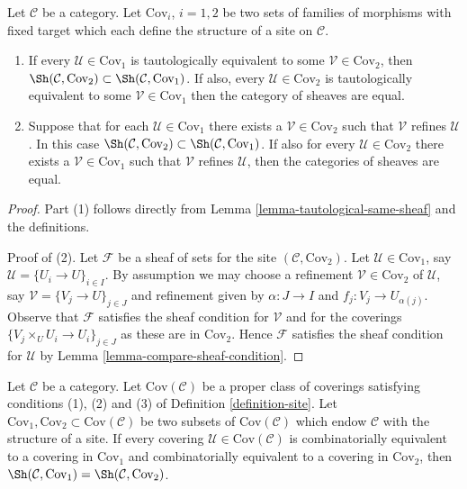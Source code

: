 \begin{lemma}
\label{lemma-refine-same-topology}
Let $\mathcal{C}$ be a category. Let $\text{Cov}_i$, $i = 1, 2$
be two sets of families of morphisms with fixed target which
each define the structure of a site on $\mathcal{C}$.
\begin{enumerate}
\item If every $\mathcal{U} \in \text{Cov}_1$ is tautologically
equivalent to some $\mathcal{V} \in \text{Cov}_2$, then
$\Sh(\mathcal{C}, \text{Cov}_2) \subset
\Sh(\mathcal{C}, \text{Cov}_1)$.
If also, every $\mathcal{U} \in \text{Cov}_2$ is tautologically
equivalent to some $\mathcal{V} \in \text{Cov}_1$ then
the category of sheaves are equal.
\item Suppose
that for each $\mathcal{U} \in \text{Cov}_1$ there exists a
$\mathcal{V} \in \text{Cov}_2$ such that $\mathcal{V}$ refines
$\mathcal{U}$. In this case
$\Sh(\mathcal{C}, \text{Cov}_2) \subset
\Sh(\mathcal{C}, \text{Cov}_1)$.
If also for every $\mathcal{U} \in \text{Cov}_2$
there exists a $\mathcal{V} \in \text{Cov}_1$ such that $\mathcal{V}$
refines $\mathcal{U}$, then the categories of sheaves
are equal.
\end{enumerate}
\end{lemma}

\begin{proof}
Part (1) follows directly from Lemma \ref{lemma-tautological-same-sheaf}
and the definitions.

\medskip\noindent
Proof of (2). Let $\mathcal{F}$ be a sheaf of sets for the site
$(\mathcal{C}, \text{Cov}_2)$. Let $\mathcal{U} \in \text{Cov}_1$,
say $\mathcal{U} = \{U_i \to U\}_{i \in I}$. By assumption we may choose a
refinement $\mathcal{V} \in \text{Cov}_2$ of $\mathcal{U}$, say
$\mathcal{V} = \{V_j \to U\}_{j \in J}$ and refinement given
by $\alpha : J \to I$ and $f_j : V_j \to U_{\alpha(j)}$.
Observe that $\mathcal{F}$ satisfies the sheaf condition for
$\mathcal{V}$ and for the coverings $\{V_j \times_U U_i \to U_i\}_{j \in J}$
as these are in $\text{Cov}_2$. Hence $\mathcal{F}$ satisfies
the sheaf condition for $\mathcal{U}$ by
Lemma \ref{lemma-compare-sheaf-condition}.
\end{proof}

\begin{lemma}
\label{lemma-choice-set-coverings-immaterial}
Let $\mathcal{C}$ be a category.
Let $\text{Cov}(\mathcal{C})$ be a proper class of coverings
satisfying conditions (1), (2) and (3) of Definition \ref{definition-site}.
Let $\text{Cov}_1, \text{Cov}_2 \subset \text{Cov}(\mathcal{C})$
be two subsets of $\text{Cov}(\mathcal{C})$ which endow
$\mathcal{C}$ with the structure of a site. If
every covering $\mathcal{U} \in \text{Cov}(\mathcal{C})$
is combinatorially equivalent to a covering in
$\text{Cov}_1$ and combinatorially equivalent to a
covering in $\text{Cov}_2$, then
$\Sh(\mathcal{C}, \text{Cov}_1) =
\Sh(\mathcal{C}, \text{Cov}_2)$.
\end{lemma}

